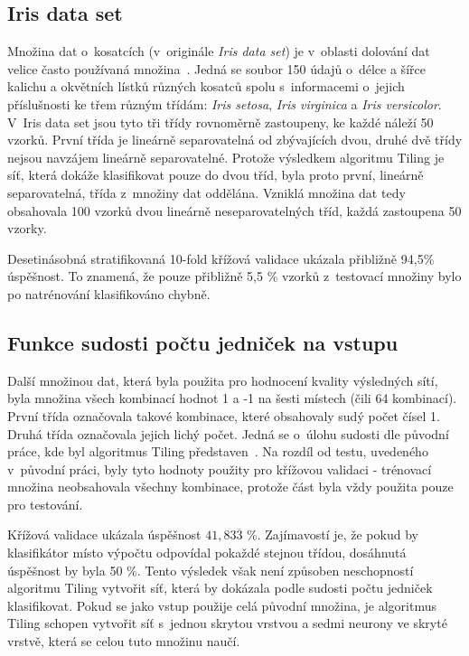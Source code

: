 \documentclass[a4paper, 11pt]{article}
\begin{document}
\subsection*{Iris data set}\label{iristest}
Množina dat o~kosatcích (v~originále \emph{Iris data set}) je v~oblasti dolování dat velice často používaná množina~\cite{iris}. Jedná se soubor 150 údajů o~délce a šířce kalichu a okvětních lístků různých kosatců spolu s~informacemi o~jejich příslušnosti ke třem různým třídám: \emph{Iris setosa}, \emph{Iris virginica} a \emph{Iris versicolor}. V~Iris data set jsou tyto tři třídy rovnoměrně zastoupeny, ke každé náleží 50 vzorků. První třída je lineárně separovatelná od zbývajících dvou, druhé dvě třídy nejsou navzájem lineárně separovatelné. Protože výsledkem algoritmu Tiling je síť, která dokáže klasifikovat pouze do dvou tříd, byla proto první, lineárně separovatelná, třída z~množiny dat oddělána. Vzniklá množina dat tedy obsahovala 100 vzorků dvou lineárně neseparovatelných tříd, každá zastoupena 50 vzorky.

Desetinásobná stratifikovaná 10-fold křížová validace ukázala přibližně 94{,}5\% úspěšnost. To znamená, že pouze přibližně 5{,}5 \% vzorků z~testovací množiny bylo po natrénování klasifikováno chybně.

\subsection*{Funkce sudosti počtu jedniček na vstupu}\label{sudost}
Další množinou dat, která byla použita pro hodnocení kvality výsledných sítí, byla množina všech kombinací hodnot 1 a -1 na šesti místech (čili 64 kombinací). První třída označovala takové kombinace, které obsahovaly sudý počet čísel 1. Druhá třída označovala jejich lichý počet. Jedná se o~úlohu sudosti dle původní práce, kde byl algoritmus Tiling představen~\cite{mezard}. Na rozdíl od testu, uvedeného v~původní práci, byly tyto hodnoty použity pro křížovou validaci - trénovací množina neobsahovala všechny kombinace, protože část byla vždy použita pouze pro testování.

Křížová validace ukázala úspěšnost $41{,}83\overline{3}$ \%. Zajímavostí je, že pokud by klasifikátor místo výpočtu odpovídal pokaždé stejnou třídou, dosáhnutá úspěšnost by byla 50 \%. Tento výsledek však není způsoben neschopností algoritmu Tiling vytvořit síť, která by dokázala podle sudosti počtu jedniček klasifikovat. Pokud se jako vstup použije celá původní množina, je algoritmus Tiling schopen vytvořit síť s~jednou skrytou vrstvou a sedmi neurony ve skryté vrstvě, která se celou tuto množinu naučí.
\end{document}
